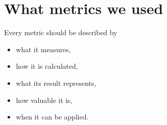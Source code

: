 
\section{What metrics we used}
Every metric should be described by
\begin{itemize}
	\item what it measures,
	\item how it is calculated,
	\item what its result represents,
	\item how valuable it is,
	\item when it can be applied.
\end{itemize}
